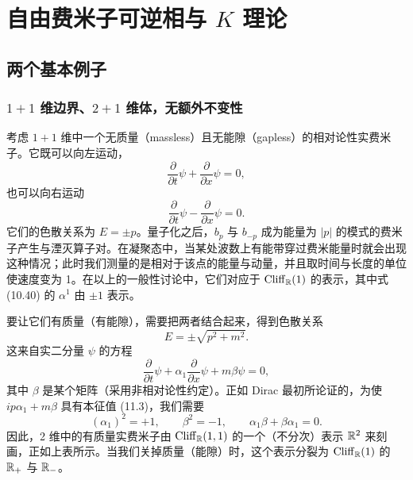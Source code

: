 \chapter{自由费米子可逆相与 $K$ 理论}

\section{两个基本例子}

\subsection{$1+1$ 维边界、$2+1$ 维体，无额外不变性}

考虑 $1+1$ 维中一个无质量（massless）且无能隙（gapless）的相对论性实费米子。它既可以向左运动，
\begin{equation}
\frac{\partial}{\partial t}\psi+\frac{\partial}{\partial x}\psi=0, \tag{11.1}
\end{equation}
也可以向右运动
\begin{equation}
\frac{\partial}{\partial t}\psi-\frac{\partial}{\partial x}\psi=0. \tag{11.2}
\end{equation}
它们的色散关系为 $E=\pm p$。量子化之后，$b_p$ 与 $b_{-p}$ 成为能量为 $|p|$ 的模式的费米子产生与湮灭算子对。在凝聚态中，当某处波数上有能带穿过费米能量时就会出现这种情况；此时我们测量的是相对于该点的能量与动量，并且取时间与长度的单位使速度变为 1。在以上的一般性讨论中，它们对应于 $\mathrm{Cliff}_{\mathbb{R}}(1)$ 的表示，其中式 (10.40) 的 $\alpha^1$ 由 $\pm1$ 表示。

要让它们有质量（有能隙），需要把两者结合起来，得到色散关系
\begin{equation}
E=\pm\sqrt{p^2+m^2}. \tag{11.3}
\end{equation}
这来自实二分量 $\psi$ 的方程
\begin{equation}
\frac{\partial}{\partial t}\psi+\alpha_1\frac{\partial}{\partial x}\psi+m\beta\psi=0, \tag{11.4}
\end{equation}
其中 $\beta$ 是某个矩阵（采用非相对论性约定）。正如 Dirac 最初所论证的，为使 $ip\alpha_1+m\beta$ 具有本征值 (11.3)，我们需要
\begin{equation}
(\alpha_1)^2=+1,\qquad \beta^2=-1,\qquad \alpha_1\beta+\beta\alpha_1=0. \tag{11.5}
\end{equation}
因此，2 维中的有质量实费米子由 $\mathrm{Cliff}_{\mathbb{R}}(1,1)$ 的一个（不分次）表示 $\mathbb{R}^2$ 来刻画，正如上表所示。当我们关掉质量（能隙）时，这个表示分裂为 $\mathrm{Cliff}_{\mathbb{R}}(1)$ 的 $\mathbb{R}_+$ 与 $\mathbb{R}_-$。


